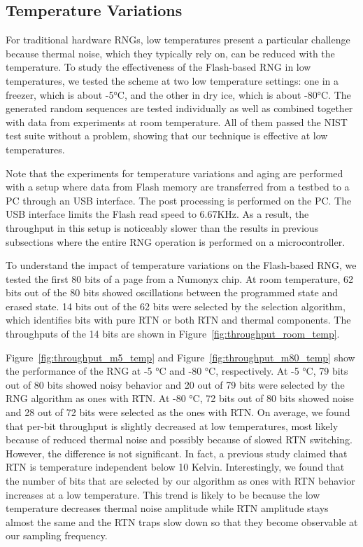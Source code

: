 \subsection{Temperature Variations}

For traditional hardware RNGs, low temperatures present a particular challenge because thermal noise, which they typically rely on, can be reduced with the temperature. To study the effectiveness of the Flash-based RNG in low temperatures, we tested the scheme at two low temperature settings: one in a freezer, which is about -5°C, and the other in dry ice, which is about -80°C. The generated random sequences are tested individually as well as combined together with data from experiments at room temperature. All of them passed the NIST test suite without a problem, showing that our technique is effective at low temperatures.

Note that the experiments for temperature variations and aging are performed with a setup where data from Flash memory are transferred from a testbed to a PC through an USB interface. The post processing is performed on the PC. The USB interface limits the Flash read speed to 6.67KHz. As a result, the throughput in this setup is noticeably slower than the results in previous subsections where the entire RNG operation is performed on a microcontroller.  

To understand the impact of temperature variations on the Flash-based RNG, we tested the first 80 bits of a page from a Numonyx chip. At room temperature, 62 bits out of the 80 bits showed oscillations between the programmed state and erased state. 14 bits out of the 62 bits were selected by the selection algorithm, which identifies bits with pure RTN or both RTN and thermal components. The throughputs of the 14 bits are shown in Figure~\ref{fig:throughput_room_temp}. 

Figure~\ref{fig:throughput_m5_temp} and Figure~\ref{fig:throughput_m80_temp} show the performance of the RNG at -5 °C and -80 °C, respectively. At -5 °C, 79 bits out of 80 bits showed noisy behavior and 20 out of 79 bits were selected by the RNG algorithm as ones with RTN. At -80 °C, 72 bits out of 80 bits showed noise and 28 out of 72 bits were selected as the ones with RTN. On average, we found that per-bit throughput is slightly decreased at low temperatures, most likely because of reduced thermal noise and possibly because of slowed RTN switching. However, the difference is not significant. In fact, a previous study \cite{scofield2000temperature} claimed that RTN is temperature independent below 10 Kelvin. Interestingly, we found that the number of bits that are selected by our algorithm as ones with RTN behavior increases at a low temperature. This trend is likely to be because the low temperature decreases thermal noise amplitude while RTN amplitude stays almost the same and the RTN traps slow down so that they become observable at our sampling frequency. 

